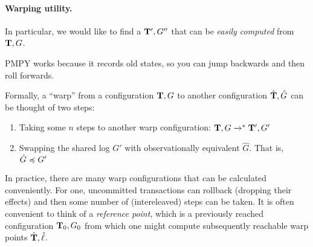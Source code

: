 \paragraph{Warping utility.}
In particular, we would like to find a $\mathbf{T}',G''$ that can be 
\emph{easily computed} from $\mathbf{T},G$.



\bigskip 
\bigskip 
\bigskip 


PMPY works because it records old states, so you can jump backwards
and then roll forwards.


Formally, a ``warp'' from a configuration $\mathbf{T},G$ to another
configuration $\hat{\mathbf{T}},\hat{G}$ can be thought of two steps:
\begin{enumerate}
\item Taking some $n$ steps to another warp configuration:
  $\mathbf{T},G \xrightarrow{}^{*} \mathbf{T}',G'$
\item Swapping the shared log $G'$ with observationally equivalent
  $\hat{G}$. That is,  $\hat{G} \preccurlyeq G'$
\end{enumerate}





In practice, there are many warp configurations that can be calculated
conveniently. For one, uncommitted transactions can rollback (dropping
their effects) and then some number of (intereleaved) steps can be taken.
%
It is often convenient to think of a \emph{reference point}, which is
a previously reached configuration $\mathbf{T}_0,G_0$ from which one might
compute subsequently reachable warp points $\hat{\mathbf{T}},\hat{\ell}$.


